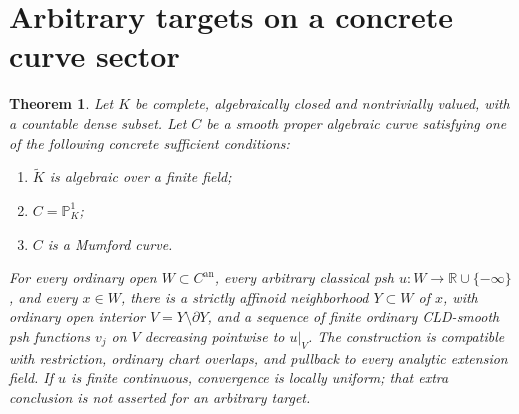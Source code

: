 \documentclass[11pt]{article}
\newtheorem{theorem}{Theorem}
\theoremstyle{remark}
\newcommand{\an}{\mathrm{an}}
\begin{document}
\section{Arbitrary targets on a concrete curve sector}
\begin{theorem}\label{thm:curves}
Let $K$ be complete, algebraically closed and nontrivially valued, with a
countable dense subset. Let $C$ be a smooth proper algebraic curve satisfying
one of the following concrete sufficient conditions:
\begin{enumerate}
\item $\widetilde K$ is algebraic over a finite field;
\item $C=\mathbb P^1_K$;
\item $C$ is a Mumford curve.
\end{enumerate}
For every ordinary open $W\subset C^\an$, every arbitrary classical psh
$u:W\to\mathbb R\cup\{-\infty\}$, and every $x\in W$, there is a strictly
affinoid neighborhood $Y\subset W$ of $x$, with ordinary open interior
$V=Y\setminus\partial Y$, and a sequence of finite ordinary CLD-smooth
psh functions $v_j$ on $V$ decreasing pointwise to $u|_V$.
The construction is compatible with restriction, ordinary chart overlaps,
and pullback to every analytic extension field. If $u$ is finite continuous,
convergence is locally uniform; that extra conclusion is not asserted for
an arbitrary target.
\end{theorem}
\end{document}

